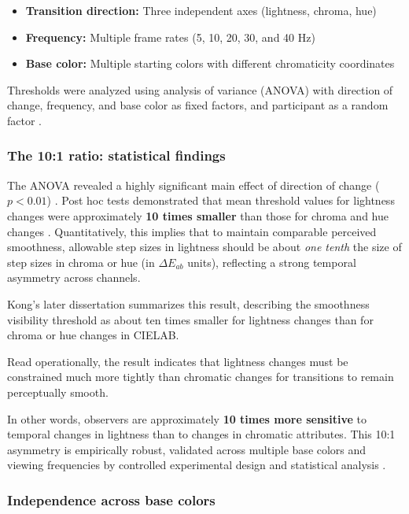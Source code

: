 \begin{itemize}
    \item \textbf{Transition direction:} Three independent axes (lightness, chroma, hue)
    \item \textbf{Frequency:} Multiple frame rates (5, 10, 20, 30, and 40 Hz)
    \item \textbf{Base color:} Multiple starting colors with different chromaticity coordinates
\end{itemize}

Thresholds were analyzed using analysis of variance (ANOVA) with direction of change, frequency, and base color as fixed factors, and participant as a random factor \citep[pp.~113--114]{sekulovski2007}.

\subsubsection*{The 10:1 ratio: statistical findings}

The ANOVA revealed a highly significant main effect of direction of change ($p < 0.01$) \citep[p.~113]{sekulovski2007}. Post hoc tests demonstrated that mean threshold values for lightness changes were approximately \textbf{10 times smaller} than those for chroma and hue changes \citep[p.~113]{sekulovski2007}. Quantitatively, this implies that to maintain comparable perceived smoothness, allowable step sizes in lightness should be about \emph{one tenth} the size of step sizes in chroma or hue (in $\Delta E_{ab}$ units), reflecting a strong temporal asymmetry across channels.

Kong's later dissertation \citep[p.~3]{kong2021} summarizes this result, describing the smoothness visibility threshold as about ten times smaller for lightness changes than for chroma or hue changes in CIELAB.

Read operationally, the result indicates that lightness changes must be constrained much more tightly than chromatic changes for transitions to remain perceptually smooth.

In other words, observers are approximately \textbf{10 times more sensitive} to temporal changes in lightness than to changes in chromatic attributes. This 10:1 asymmetry is empirically robust, validated across multiple base colors and viewing frequencies by controlled experimental design and statistical analysis \citep[pp.~113--114]{sekulovski2007}.

\subsubsection*{Independence across base colors}

